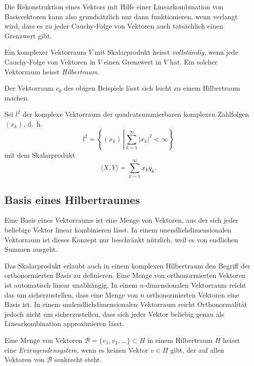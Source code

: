 Die Rekonstruktion eines Vektors mit Hilfe einer Linearkombination von
Basisvektoren kann also grundsätzlich nur dann funktionieren, wenn verlangt
wird, dass es zu jeder Cauchy-Folge von Vektoren auch tatsächlich einen
Grenzwert gibt.

\begin{definition}
Ein komplexer Vektorraum $V$ mit Skalarprodukt heisst {\em vollständig}, 
wenn jede Cauchy-Folge von Vektoren in $V$ einen Grenzwert in $V$ hat.
Ein solcher Vektorraum heisst {\em Hilbertraum}.
\end{definition}

Der Vektorraum $c_0$ des obigen Beispiels lässt sich leicht zu einem
Hilbertraum machen.

\begin{beispiel}
Sei $l^2$ der komplexe Vektorraum der quadratsummierbaren komplexen
Zahlfolgen $(x_k)$, d.~h.
\[
l^2 = \left\{ (x_k)\,\left| \sum_{k=1}^\infty |x_k|^2 < \infty \right.\right\}
\]
mit dem Skalarprodukt
\[
\langle X,Y\rangle = \sum_{k=1}^\infty x_k\bar{y}_k.
\]
\end{beispiel}

\subsection{Basis eines Hilbertraumes
\label{subsecdtion:hilberraum-basis}}
Eine Basis eines Vektorraums ist eine Menge von Vektoren, aus der sich
jeder beliebige Vektor linear kombinieren lässt.
In einem unendlichdimensionalen Vektorraum ist dieses Konzept nur
beschränkt nützlich, weil es von endlichen Summen ausgeht.

Das Skalarprodukt erlaubt auch in einem komplexen Hilbertraum den Begriff
der orthonormierten Basis zu definieren.
Eine Menge von orthonormierten Vektoren ist automatisch linear unabhängig.
In einem $n$-dimensionalen Vektorraum reicht das um sicherzustellen,
dass eine Menge von $n$ orthonormierten Vektoren eine Basis ist.
In einem undendlichdimensionalen Vektorraum reicht Orthonormalität
jedoch nicht um sicherzustellen, dass sich jeder Vektor beliebig genau
als Linearkombination approximieren lässt.

\begin{definition}
Eine Menge von Vektoren $\mathcal{B} = \{v_1,v_2,\dots\}\subset H$ in einem
Hilbertraum $H$ heisst eine {\em Erzeugendensystem}, wenn es keinen Vektor
$v\in H$ gibt, der auf allen Vektoren von $\mathcal{B}$ senkrecht steht.
\end{definition}

